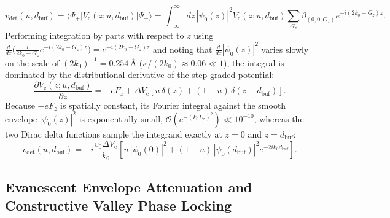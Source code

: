\documentclass[11pt,letterpaper]{article}
\theoremstyle{definition}
\begin{document}
\begin{equation}
  v_{\mathrm{det}}(u, d_{\mathrm{buf}}) = \langle \Psi_+ | V_{\mathrm{c}}(z; u, d_{\mathrm{buf}}) | \Psi_- \rangle = \int_{-\infty}^{\infty} dz \, |\psi_0(z)|^2 V_{\mathrm{c}}(z; u, d_{\mathrm{buf}}) \sum_{G_z} \beta_{(0,0,G_z)} e^{-i(2k_0 - G_z)z}.
  \label{eq:appA_vdet_integral}
\end{equation}
Performing integration by parts with respect to $z$ using $\frac{d}{dz}\bigl(\frac{i}{2k_0 - G_z} e^{-i(2k_0 - G_z)z}\bigr) = e^{-i(2k_0 - G_z)z}$ and noting that $\frac{d}{dz}|\psi_0(z)|^2$ varies slowly on the scale of $(2k_0)^{-1} = 0.254\,\text{\AA}$ ($\bar{\kappa}/(2k_0) \approx 0.06 \ll 1$), the integral is dominated by the distributional derivative of the step-graded potential:
\begin{equation}
  \frac{\partial V_{\mathrm{c}}(z; u, d_{\mathrm{buf}})}{\partial z} = -e F_z + \Delta V_{\mathrm{c}} \left[ u \, \delta(z) + (1 - u) \, \delta(z - d_{\mathrm{buf}}) \right].
  \label{eq:appA_dVc_dz}
\end{equation}
Because $-e F_z$ is spatially constant, its Fourier integral against the smooth envelope $|\psi_0(z)|^2$ is exponentially small, $\mathcal{O}(e^{-(k_0 L_z)^2}) \ll 10^{-10}$, whereas the two Dirac delta functions sample the integrand exactly at $z = 0$ and $z = d_{\mathrm{buf}}$:
\begin{equation}
  v_{\mathrm{det}}(u, d_{\mathrm{buf}}) = -i \frac{v_0 \Delta V_{\mathrm{c}}}{k_0} \left[ u \, |\psi_0(0)|^2 + (1 - u) \, |\psi_0(d_{\mathrm{buf}})|^2 e^{-2i k_0 d_{\mathrm{buf}}} \right].
  \label{eq:appA_vdet_evaluated}
\end{equation}

\subsection{Evanescent Envelope Attenuation and Constructive Valley Phase Locking}
\end{document}
